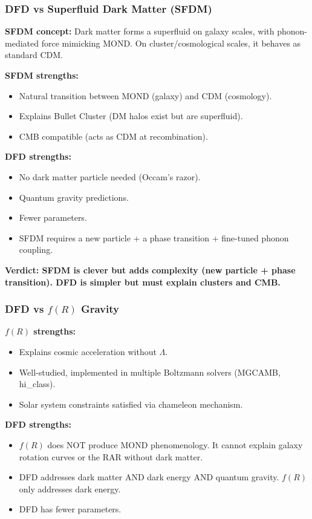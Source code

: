 \documentclass[11pt,a4paper]{article}
\begin{document}
\subsubsection{DFD vs Superfluid Dark Matter (SFDM)}

\textbf{SFDM concept:} Dark matter forms a superfluid on galaxy scales, with phonon-mediated force mimicking MOND. On cluster/cosmological scales, it behaves as standard CDM.

\textbf{SFDM strengths:}
\begin{itemize}
\item Natural transition between MOND (galaxy) and CDM (cosmology).
\item Explains Bullet Cluster (DM halos exist but are superfluid).
\item CMB compatible (acts as CDM at recombination).
\end{itemize}

\textbf{DFD strengths:}
\begin{itemize}
\item No dark matter particle needed (Occam's razor).
\item Quantum gravity predictions.
\item Fewer parameters.
\item SFDM requires a new particle + a phase transition + fine-tuned phonon coupling.
\end{itemize}

\textbf{Verdict: SFDM is clever but adds complexity (new particle + phase transition). DFD is simpler but must explain clusters and CMB.}

\subsubsection{DFD vs $f(R)$ Gravity}

\textbf{$f(R)$ strengths:}
\begin{itemize}
\item Explains cosmic acceleration without $\Lambda$.
\item Well-studied, implemented in multiple Boltzmann solvers (MGCAMB, hi\_class).
\item Solar system constraints satisfied via chameleon mechanism.
\end{itemize}

\textbf{DFD strengths:}
\begin{itemize}
\item $f(R)$ does NOT produce MOND phenomenology. It cannot explain galaxy rotation curves or the RAR without dark matter.
\item DFD addresses dark matter AND dark energy AND quantum gravity. $f(R)$ only addresses dark energy.
\item DFD has fewer parameters.
\end{itemize}
\end{document}

